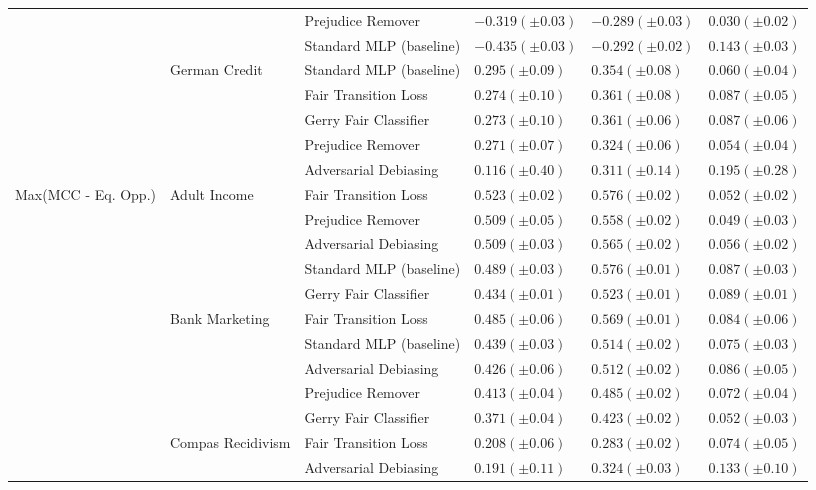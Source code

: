 \begin{tabular}{llllll}
 &  & Prejudice Remover & $-0.319 (\pm0.03)$ & $-0.289 (\pm0.03)$ & $0.030 (\pm0.02)$ \\
 &  & Standard MLP (baseline) & $-0.435 (\pm0.03)$ & $-0.292 (\pm0.02)$ & $0.143 (\pm0.03)$ \\
\cline{2-6}
 & \multirow[t]{5}{*}{German Credit} & Standard MLP (baseline) & $0.295 (\pm0.09)$ & $0.354 (\pm0.08)$ & $0.060 (\pm0.04)$ \\
 &  & Fair Transition Loss & $0.274 (\pm0.10)$ & $0.361 (\pm0.08)$ & $0.087 (\pm0.05)$ \\
 &  & Gerry Fair Classifier & $0.273 (\pm0.10)$ & $0.361 (\pm0.06)$ & $0.087 (\pm0.06)$ \\
 &  & Prejudice Remover & $0.271 (\pm0.07)$ & $0.324 (\pm0.06)$ & $0.054 (\pm0.04)$ \\
 &  & Adversarial Debiasing & $0.116 (\pm0.40)$ & $0.311 (\pm0.14)$ & $0.195 (\pm0.28)$ \\
\cline{1-6} \cline{2-6}
\multirow[t]{20}{*}{Max(MCC - Eq. Opp.)} & \multirow[t]{5}{*}{Adult Income} & Fair Transition Loss & $0.523 (\pm0.02)$ & $0.576 (\pm0.02)$ & $0.052 (\pm0.02)$ \\
 &  & Prejudice Remover & $0.509 (\pm0.05)$ & $0.558 (\pm0.02)$ & $0.049 (\pm0.03)$ \\
 &  & Adversarial Debiasing & $0.509 (\pm0.03)$ & $0.565 (\pm0.02)$ & $0.056 (\pm0.02)$ \\
 &  & Standard MLP (baseline) & $0.489 (\pm0.03)$ & $0.576 (\pm0.01)$ & $0.087 (\pm0.03)$ \\
 &  & Gerry Fair Classifier & $0.434 (\pm0.01)$ & $0.523 (\pm0.01)$ & $0.089 (\pm0.01)$ \\
\cline{2-6}
 & \multirow[t]{5}{*}{Bank Marketing} & Fair Transition Loss & $0.485 (\pm0.06)$ & $0.569 (\pm0.01)$ & $0.084 (\pm0.06)$ \\
 &  & Standard MLP (baseline) & $0.439 (\pm0.03)$ & $0.514 (\pm0.02)$ & $0.075 (\pm0.03)$ \\
 &  & Adversarial Debiasing & $0.426 (\pm0.06)$ & $0.512 (\pm0.02)$ & $0.086 (\pm0.05)$ \\
 &  & Prejudice Remover & $0.413 (\pm0.04)$ & $0.485 (\pm0.02)$ & $0.072 (\pm0.04)$ \\
 &  & Gerry Fair Classifier & $0.371 (\pm0.04)$ & $0.423 (\pm0.02)$ & $0.052 (\pm0.03)$ \\
\cline{2-6}
 & \multirow[t]{5}{*}{Compas Recidivism} & Fair Transition Loss & $0.208 (\pm0.06)$ & $0.283 (\pm0.02)$ & $0.074 (\pm0.05)$ \\
 &  & Adversarial Debiasing & $0.191 (\pm0.11)$ & $0.324 (\pm0.03)$ & $0.133 (\pm0.10)$ \\

\end{tabular}
